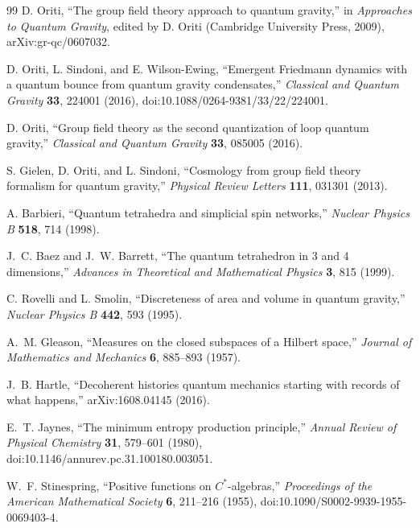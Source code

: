 \documentclass[11pt]{article}
\begin{document}
\begin{thebibliography}{99}
D. Oriti,
``The group field theory approach to quantum gravity,''
in \emph{Approaches to Quantum Gravity}, edited by D. Oriti (Cambridge University Press, 2009),
arXiv:gr-qc/0607032.

D. Oriti, L. Sindoni, and E. Wilson-Ewing,
``Emergent Friedmann dynamics with a quantum bounce from quantum gravity condensates,''
\emph{Classical and Quantum Gravity} \textbf{33}, 224001 (2016),
doi:10.1088/0264-9381/33/22/224001.

D. Oriti,
``Group field theory as the second quantization of loop quantum gravity,''
\emph{Classical and Quantum Gravity} \textbf{33}, 085005 (2016).

S. Gielen, D. Oriti, and L. Sindoni,
``Cosmology from group field theory formalism for quantum gravity,''
\emph{Physical Review Letters} \textbf{111}, 031301 (2013).

A. Barbieri,
``Quantum tetrahedra and simplicial spin networks,''
\emph{Nuclear Physics B} \textbf{518}, 714 (1998).

J.~C. Baez and J.~W. Barrett,
``The quantum tetrahedron in 3 and 4 dimensions,''
\emph{Advances in Theoretical and Mathematical Physics} \textbf{3}, 815 (1999).

C. Rovelli and L. Smolin,
``Discreteness of area and volume in quantum gravity,''
\emph{Nuclear Physics B} \textbf{442}, 593 (1995).

A.~M. Gleason,
``Measures on the closed subspaces of a Hilbert space,''
\emph{Journal of Mathematics and Mechanics} \textbf{6}, 885--893 (1957).

J.~B. Hartle,
``Decoherent histories quantum mechanics starting with records of what happens,''
arXiv:1608.04145 (2016).

E.~T. Jaynes,
``The minimum entropy production principle,''
\emph{Annual Review of Physical Chemistry} \textbf{31}, 579--601 (1980),
doi:10.1146/annurev.pc.31.100180.003051.

W.~F. Stinespring,
``Positive functions on $C^*$-algebras,''
\emph{Proceedings of the American Mathematical Society} \textbf{6}, 211--216 (1955),
doi:10.1090/S0002-9939-1955-0069403-4.


\end{thebibliography}
\end{document}
